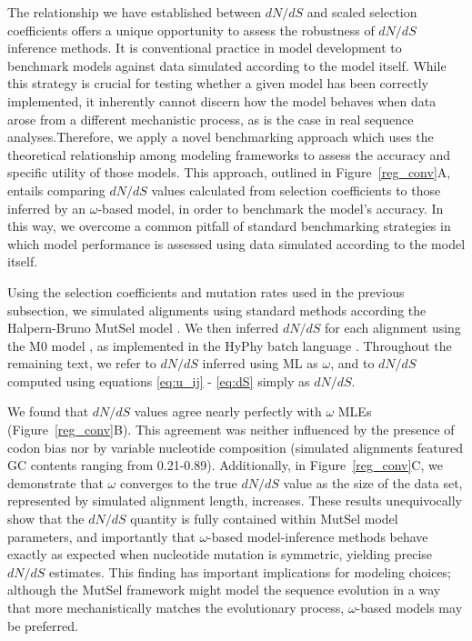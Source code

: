 \documentclass[11pt]{article}
\begin{document}
The relationship we have established between $dN/dS$ and scaled selection coefficients offers a unique opportunity to assess the robustness of $dN/dS$ inference methods. It is conventional practice in model development to benchmark models against data simulated according to the model itself. While this strategy is crucial for testing whether a given model has been correctly implemented, it inherently cannot discern how the model behaves when data arose from a different mechanistic process, as is the case in real sequence analyses.Therefore, we apply a novel benchmarking approach which uses the theoretical relationship among modeling frameworks to assess the accuracy and specific utility of those models. This approach, outlined in Figure~\ref{reg_conv}A, entails comparing $dN/dS$ values calculated from selection coefficients to those inferred by an $\omega$-based model, in order to benchmark the model's accuracy. In this way, we overcome a common pitfall of standard benchmarking strategies in which model performance is assessed using data simulated according to the model itself.

Using the selection coefficients and mutation rates used in the previous subsection, we simulated alignments using standard methods \cite{Yang2006} according the Halpern-Bruno MutSel model \cite{HalpernBruno1998}. We then inferred $dN/dS$ for each alignment using the M0 model \cite{GoldmanYang1994,Yangetal2000}, as implemented in the HyPhy batch language \cite{KosakovskyPondetal2005}. Throughout the remaining text, we refer to $dN/dS$ inferred using ML as $\omega$, and to $dN/dS$ computed using equations \eqref{eq:u_ij} - \eqref{eq:dS} simply as $dN/dS$. 

We found that $dN/dS$ values agree nearly perfectly with $\omega$ MLEs (Figure~\ref{reg_conv}B). This agreement was neither influenced by the presence of codon bias nor by variable nucleotide composition (simulated alignments featured GC contents ranging from 0.21-0.89). Additionally, in Figure~\ref{reg_conv}C, we demonstrate that $\omega$ converges to the true $dN/dS$ value as the size of the data set, represented by simulated alignment length, increases. These results unequivocally show that the $dN/dS$ quantity is fully contained within MutSel model parameters, and importantly that $\omega$-based model-inference methods behave exactly as expected when nucleotide mutation is symmetric, yielding precise $dN/dS$ estimates. This finding has important implications for modeling choices; although the MutSel framework might model the sequence evolution in a way that more mechanistically matches the evolutionary process, $\omega$-based models may be preferred.
\end{document}
